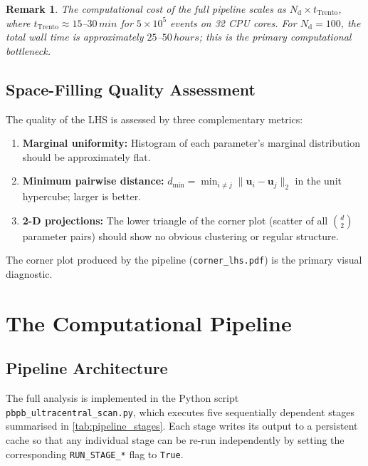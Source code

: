 \documentclass[12pt,a4paper,twoside]{report}
\newtheorem{remark}{Remark}[section]
\begin{document}
\begin{remark}
The computational cost of the full pipeline scales as
$N_\mathrm{d} \times t_\mathrm{Trento}$, where
$t_\mathrm{Trento} \approx 15$--$30\,\si{min}$ for $5 \times 10^5$
events on 32 CPU cores.  For $N_\mathrm{d} = 100$, the total wall time
is approximately $25$--$50\,\si{hours}$; this is the primary
computational bottleneck.
\end{remark}

\subsection{Space-Filling Quality Assessment}
\label{subsec:lhs_quality}

The quality of the LHS is assessed by three complementary metrics:
\begin{enumerate}[label=(\alph*), leftmargin=*]
  \item \textbf{Marginal uniformity:} Histogram of each parameter's
        marginal distribution should be approximately flat.
  \item \textbf{Minimum pairwise distance:}
        $d_\mathrm{min} = \min_{i\neq j}\|\bm{u}_i - \bm{u}_j\|_2$
        in the unit hypercube; larger is better.
  \item \textbf{2-D projections:} The lower triangle of the corner
        plot (scatter of all $\binom{d}{2}$ parameter pairs) should
        show no obvious clustering or regular structure.
\end{enumerate}

\noindent
The corner plot produced by the pipeline (\texttt{corner\_lhs.pdf}) is
the primary visual diagnostic.

\section{The Computational Pipeline}
\label{sec:pipeline}

\subsection{Pipeline Architecture}
\label{subsec:pipeline_arch}

The full analysis is implemented in the Python script
\texttt{pbpb\_ultracentral\_scan.py}, which executes five sequentially
dependent stages summarised in \cref{tab:pipeline_stages}.  Each stage
writes its output to a persistent cache so that any individual stage
can be re-run independently by setting the corresponding
\texttt{RUN\_STAGE\_*} flag to \texttt{True}.
\end{document}
